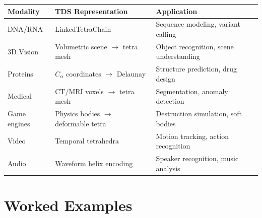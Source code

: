 \begin{center}
\renewcommand{\arraystretch}{1.15}
\begin{tabularx}{0.95\textwidth}{L{2.5cm} L{3.5cm} Y}
\toprule
\textbf{Modality} & \textbf{TDS Representation} & \textbf{Application} \\
\midrule
DNA/RNA & LinkedTetraChain & Sequence modeling, variant calling \\
3D Vision & Volumetric scene $\to$ tetra mesh & Object recognition, scene understanding \\
Proteins & $C_\alpha$ coordinates $\to$ Delaunay & Structure prediction, drug design \\
Medical & CT/MRI voxels $\to$ tetra mesh & Segmentation, anomaly detection \\
Game engines & Physics bodies $\to$ deformable tetra & Destruction simulation, soft bodies \\
Video & Temporal tetrahedra & Motion tracking, action recognition \\
Audio & Waveform helix encoding & Speaker recognition, music analysis \\
\bottomrule
\end{tabularx}
\end{center}

\section{Worked Examples}
\label{sec:ch10-worked-examples}

